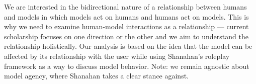 We are interested in the bidirectional nature of a relationship between humans and models in which models act on humans and humans act on models. This is why we need to examine human-model interactions as a relationship --- current scholarship focuses on one direction or the other \cite{nass_computers_1994, shanahan_role_2023, casper_open_2023} and we aim to understand the relationship holistically. Our analysis is based on the idea that the model can be affected by its relationship with the user while using Shanahan's roleplay framework as a way to discuss model behavior. Note: we remain agnostic about model agency, where Shanahan takes a clear stance against. 